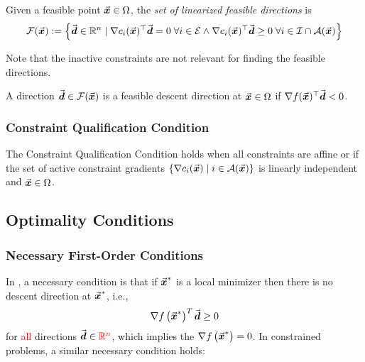 \begin{definition}\label{def:linearized_feasible_directions}
  Given a feasible point \(\vec{\boldsymbol{x}}\in\Omega\), the \emph{set of linearized feasible directions} is
  \begin{equation}\label{eq:linearized_feasible_directions}
    \mathcal{F}(\vec{\boldsymbol{x}}) := \left\{ \vec{\boldsymbol{d}}\in\mathbb{R}^{n} \mid \nabla c_{i}(\vec{\boldsymbol{x}})^{\top}\vec{\boldsymbol{d}}=0 \; \forall i\in\mathcal{E} \land \nabla c_{i}(\vec{\boldsymbol{x}})^{\top}\vec{\boldsymbol{d}}\ge 0 \; \forall i\in\mathcal{I}\cap\mathcal{A}(\vec{\boldsymbol{x}}) \right\}
  \end{equation}
\end{definition}
Note that the inactive constraints are not relevant for finding the feasible directions.

\begin{definition}\label{def:feasible_descent_direction}
  A direction \(\vec{\boldsymbol{d}}\in\mathcal{F}(\vec{\boldsymbol{x}})\) is a feasible descent direction at \(\vec{\boldsymbol{x}} \in \Omega\) if \(\nabla f(\vec{\boldsymbol{x}})^{\top}\vec{\boldsymbol{d}} < 0\).
\end{definition}

\subsubsection{Constraint Qualification Condition}

\begin{definition}\label{def:constraint_qualification_condition}
The Constraint Qualification Condition holds when all constraints are affine or if the set of active constraint gradients \(\{ \nabla c_{i}(\vec{\boldsymbol{x}}) \mid i\in\mathcal{A}(\vec{\boldsymbol{x}}) \}\) is linearly independent and \(\vec{\boldsymbol{x}} \in \Omega\).
\end{definition}


\subsection{Optimality Conditions} 

\subsubsection{Necessary First-Order Conditions}
In , a necessary condition is that if $\vec{\boldsymbol{x}}^*$ is a local minimizer then there is no descent direction at $\vec{\boldsymbol{x}}^*$, i.e.,
\[
\nabla f\left(\vec{\boldsymbol{x}}^*\right)^T \vec{\boldsymbol{d}} \geq 0
\]
for \textcolor{red}{all} directions \(\vec{\boldsymbol{d}} \in \textcolor{red}{\mathbb{R}^n}\), which implies the  $\nabla f\left(\vec{\boldsymbol{x}}^*\right)=0$.
In constrained problems, a similar necessary condition holds:

